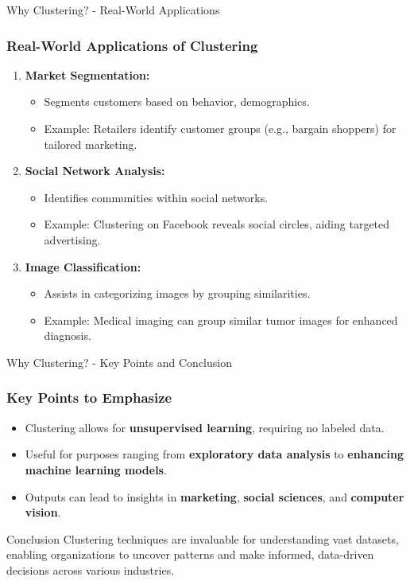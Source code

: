 \documentclass[aspectratio=169]{beamer}
\begin{document}
\begin{frame}[fragile]{Why Clustering? - Real-World Applications}
  \frametitle{Real-World Applications of Clustering}

  \begin{enumerate}
    \item \textbf{Market Segmentation:}
      \begin{itemize}
        \item Segments customers based on behavior, demographics.
        \item Example: Retailers identify customer groups (e.g., bargain shoppers) for tailored marketing.
      \end{itemize}

    \item \textbf{Social Network Analysis:}
      \begin{itemize}
        \item Identifies communities within social networks.
        \item Example: Clustering on Facebook reveals social circles, aiding targeted advertising.
      \end{itemize}

    \item \textbf{Image Classification:}
      \begin{itemize}
        \item Assists in categorizing images by grouping similarities.
        \item Example: Medical imaging can group similar tumor images for enhanced diagnosis.
      \end{itemize}
  \end{enumerate}
\end{frame}

\begin{frame}[fragile]{Why Clustering? - Key Points and Conclusion}
  \frametitle{Key Points to Emphasize}

  \begin{itemize}
    \item Clustering allows for \textbf{unsupervised learning}, requiring no labeled data.
    \item Useful for purposes ranging from \textbf{exploratory data analysis} to \textbf{enhancing machine learning models}.
    \item Outputs can lead to insights in \textbf{marketing}, \textbf{social sciences}, and \textbf{computer vision}.
  \end{itemize}

  \begin{block}{Conclusion}
    Clustering techniques are invaluable for understanding vast datasets, enabling organizations to uncover patterns and make informed, data-driven decisions across various industries.
  \end{block}
\end{frame}
\end{document}
